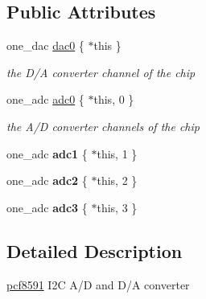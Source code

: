 \subsection*{Public Attributes}
\begin{DoxyCompactItemize}
\item 
one\+\_\+dac \hyperlink{classhwlib_1_1pcf8591_a49118bd1d284d0e72aca58558b854b2d}{dac0} \{ $\ast$this \}\hypertarget{classhwlib_1_1pcf8591_a49118bd1d284d0e72aca58558b854b2d}{}\label{classhwlib_1_1pcf8591_a49118bd1d284d0e72aca58558b854b2d}

\begin{DoxyCompactList}\small\item\em the D/A converter channel of the chip \end{DoxyCompactList}\end{DoxyCompactItemize}
{\bf }\par
\begin{DoxyCompactItemize}
\item 
one\+\_\+adc \hyperlink{classhwlib_1_1pcf8591_a29a87f5711fbbd85ed5c477a5eab1b6f}{adc0} \{ $\ast$this, 0 \}
\begin{DoxyCompactList}\small\item\em the A/D converter channels of the chip \end{DoxyCompactList}\item 
one\+\_\+adc {\bfseries adc1} \{ $\ast$this, 1 \}\hypertarget{classhwlib_1_1pcf8591_aa916285265761457b7c95207d2b41118}{}\label{classhwlib_1_1pcf8591_aa916285265761457b7c95207d2b41118}

\item 
one\+\_\+adc {\bfseries adc2} \{ $\ast$this, 2 \}\hypertarget{classhwlib_1_1pcf8591_acb459e70a386e9b62fb0680ea5e84cfb}{}\label{classhwlib_1_1pcf8591_acb459e70a386e9b62fb0680ea5e84cfb}

\item 
one\+\_\+adc {\bfseries adc3} \{ $\ast$this, 3 \}\hypertarget{classhwlib_1_1pcf8591_aa89be33b4b8d5a329120e867e8d8245f}{}\label{classhwlib_1_1pcf8591_aa89be33b4b8d5a329120e867e8d8245f}

\end{DoxyCompactItemize}



\subsection{Detailed Description}
\hyperlink{classhwlib_1_1pcf8591}{pcf8591} I2C A/D and D/A converter 


